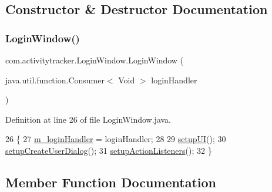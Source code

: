 \subsection{Constructor \& Destructor Documentation}
\mbox{\label{classcom_1_1activitytracker_1_1_login_window_a137cce127ffa1660c70d3fddbc0e2a74}} 
\subsubsection{\texorpdfstring{Login\+Window()}{LoginWindow()}}
{\footnotesize\ttfamily com.\+activitytracker.\+Login\+Window.\+Login\+Window (\begin{DoxyParamCaption}\item[{java.\+util.\+function.\+Consumer$<$ Void $>$}]{login\+Handler }\end{DoxyParamCaption})\hspace{0.3cm}{\ttfamily [package]}}



Definition at line 26 of file Login\+Window.\+java.


\begin{DoxyCode}
26                                                                 \{
27         \mbox{\hyperlink{classcom_1_1activitytracker_1_1_login_window_aab28a8e6372499a8690d524dedeaf9e1}{m\_loginHandler}} = loginHandler;
28 
29         \mbox{\hyperlink{classcom_1_1activitytracker_1_1_login_window_a7af9edf52b3028437e2159f0be9893a9}{setupUI}}();
30         \mbox{\hyperlink{classcom_1_1activitytracker_1_1_login_window_a567db7b15448fe9d9c76addbcee4092b}{setupCreateUserDialog}}();
31         \mbox{\hyperlink{classcom_1_1activitytracker_1_1_login_window_af1ff236b841c51bfb49e143344a3c3ac}{setupActionListeners}}();
32     \}
\end{DoxyCode}


\subsection{Member Function Documentation}
\mbox{\label{classcom_1_1activitytracker_1_1_login_window_ab1ea45e86bbb79bccd06531279f1e443}} 
